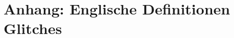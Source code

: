 


\appendix
\chapter{Anhang: Englische Definitionen Glitches}\label{chap.anhang_dictionaire}
 
 






\newpage
